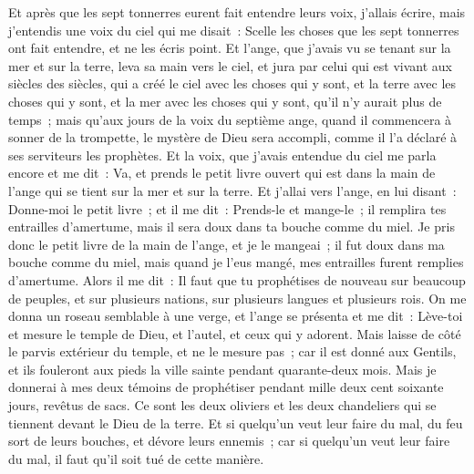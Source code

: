 \begin{multicols}{2}
Et après que les sept tonnerres eurent fait entendre leurs voix, j'allais écrire, mais j'entendis une voix du ciel qui me disait~: Scelle les choses que les sept tonnerres ont fait entendre, et ne les écris point.
Et l'ange, que j'avais vu se tenant sur la mer et sur la terre, leva sa main vers le ciel,
et jura par celui qui est vivant aux siècles des siècles, qui a créé le ciel avec les choses qui y sont, et la terre avec les choses qui y sont, et la mer avec les choses qui y sont, qu'il n'y aurait plus de temps~;
mais qu'aux jours de la voix du septième ange, quand il commencera à sonner de la trompette, le mystère de Dieu sera accompli, comme il l'a déclaré à ses serviteurs les prophètes.
Et la voix, que j'avais entendue du ciel me parla encore et me dit~: Va, et prends le petit livre ouvert qui est dans la main de l'ange qui se tient sur la mer et sur la terre.
Et j'allai vers l'ange, en lui disant~: Donne-moi le petit livre~; et il me dit~: Prends-le et mange-le~; il remplira tes entrailles d'amertume, mais il sera doux dans ta bouche comme du miel.
Je pris donc le petit livre de la main de l'ange, et je le mangeai~; il fut doux dans ma bouche comme du miel, mais quand je l'eus mangé, mes entrailles furent remplies d'amertume.
Alors il me dit~: Il faut que tu prophétises de nouveau sur beaucoup de peuples, et sur plusieurs nations, sur plusieurs langues et plusieurs rois.
\VerseOne{}On me donna un roseau semblable à une verge, et l'ange se présenta et me dit~: Lève-toi et mesure le temple de Dieu, et l'autel, et ceux qui y adorent.
Mais laisse de côté le parvis extérieur du temple, et ne le mesure pas~; car il est donné aux Gentils, et ils fouleront aux pieds la ville sainte pendant quarante-deux mois.
Mais je donnerai à mes deux témoins de prophétiser pendant mille deux cent soixante jours, revêtus de sacs.
Ce sont les deux oliviers et les deux chandeliers qui se tiennent devant le Dieu de la terre. 
Et si quelqu'un veut leur faire du mal, du feu sort de leurs bouches, et dévore leurs ennemis~; car si quelqu'un veut leur faire du mal, il faut qu'il soit tué de cette manière.

\end{multicols}
